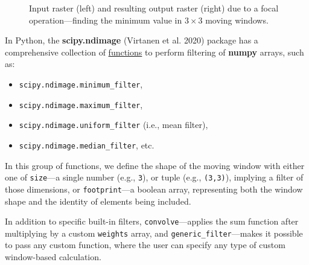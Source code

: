 \documentclass[
  letterpaper,
]{krantz}
\providecommand{\tightlist}{%
  \setlength{\itemsep}{0pt}\setlength{\parskip}{0pt}}\usepackage{longtable,booktabs,array}
\begin{document}
\begin{figure}


\caption{\label{fig-focal-filter}Input raster (left) and resulting
output raster (right) due to a focal operation---finding the minimum
value in \(3 \times 3\) moving windows.}

\end{figure}%

In Python, the \textbf{scipy.ndimage} (Virtanen et al. 2020) package has
a comprehensive collection of
\href{https://docs.scipy.org/doc/scipy/reference/ndimage.html\#filters}{functions}
to perform filtering of \textbf{numpy} arrays, such as:

\begin{itemize}
\tightlist
\item
  \texttt{scipy.ndimage.minimum\_filter},
\item
  \texttt{scipy.ndimage.maximum\_filter},
\item
  \texttt{scipy.ndimage.uniform\_filter} (i.e., mean filter),
\item
  \texttt{scipy.ndimage.median\_filter}, etc.
\end{itemize}

In this group of functions, we define the shape of the moving window
with either one of \texttt{size}---a single number (e.g., \texttt{3}),
or tuple (e.g., \texttt{(3,3)}), implying a filter of those dimensions,
or \texttt{footprint}---a boolean array, representing both the window
shape and the identity of elements being included.

In addition to specific built-in filters, \texttt{convolve}---applies
the sum function after multiplying by a custom \texttt{weights} array,
and \texttt{generic\_filter}---makes it possible to pass any custom
function, where the user can specify any type of custom window-based
calculation.
\end{document}
